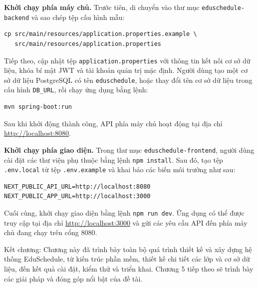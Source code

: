\documentclass[../DoAn.tex]{subfiles}
\begin{document}
\textbf{Khởi chạy phía máy chủ.} Trước tiên, di chuyển vào thư mục
\texttt{eduschedule-backend} và sao chép tệp cấu hình mẫu:

\begin{lstlisting}[basicstyle=\ttfamily\fontsize{12}{15}\selectfont,columns=fullflexible,keepspaces=true,xleftmargin=1em]
cp src/main/resources/application.properties.example \
   src/main/resources/application.properties
\end{lstlisting}

Tiếp theo, cập nhật tệp \texttt{application.properties} với thông tin kết nối cơ
sở dữ liệu, khóa bí mật JWT và tài khoản quản trị mặc định. Người dùng tạo một
cơ sở dữ liệu PostgreSQL có tên \texttt{eduschedule}, hoặc thay đổi tên cơ sở dữ
liệu trong cấu hình \texttt{DB\_URL}, rồi chạy ứng dụng bằng lệnh:

\begin{lstlisting}[basicstyle=\ttfamily\fontsize{12}{15}\selectfont,columns=fullflexible,keepspaces=true,xleftmargin=1em]
mvn spring-boot:run
\end{lstlisting}

Sau khi khởi động thành công, API phía máy chủ hoạt động tại địa chỉ
\url{http://localhost:8080}.

\textbf{Khởi chạy phía giao diện.} Trong thư mục
\texttt{eduschedule-frontend}, người dùng cài đặt các thư viện phụ thuộc bằng
lệnh \texttt{npm install}. Sau đó, tạo tệp \texttt{.env.local} từ tệp
\texttt{.env.example} và khai báo các biến môi trường như sau:

\begin{lstlisting}[basicstyle=\ttfamily\fontsize{12}{15}\selectfont,columns=fullflexible,keepspaces=true,xleftmargin=1em]
NEXT_PUBLIC_API_URL=http://localhost:8080
NEXT_PUBLIC_APP_URL=http://localhost:3000
\end{lstlisting}

Cuối cùng, khởi chạy giao diện bằng lệnh \texttt{npm run dev}. Ứng dụng có thể
được truy cập tại địa chỉ \url{http://localhost:3000} và gửi các yêu cầu API
đến phía máy chủ đang chạy trên cổng 8080.

Kết chương: Chương này đã trình bày toàn bộ quá trình thiết kế và xây dựng hệ thống EduSchedule, từ kiến trúc phần mềm, thiết kế chi tiết các lớp và cơ sở dữ liệu, đến kết quả cài đặt, kiểm thử và triển khai. Chương 5 tiếp theo sẽ trình bày các giải pháp và đóng góp nổi bật của đề tài.
\end{document}
